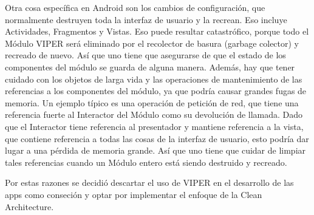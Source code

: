 Otra cosa específica en Android son los cambios de configuración, que normalmente destruyen toda la interfaz de usuario y la recrean. Eso incluye Actividades, Fragmentos y Vistas. Eso puede resultar catastrófico, porque todo el Módulo VIPER será eliminado por el recolector de basura (garbage colector) y recreado de nuevo. Así que uno tiene que asegurarse de que el estado de los componentes del módulo se guarda de alguna manera. Además, hay que tener cuidado con los objetos de larga vida y las operaciones de mantenimiento de las referencias a los componentes del módulo, ya que podría causar grandes fugas de memoria. Un ejemplo típico es una operación de petición de red, que tiene una referencia fuerte al Interactor del Módulo como su devolución de llamada. Dado que el Interactor tiene referencia al presentador y mantiene referencia a la vista, que contiene referencia a todas las cosas de la interfaz de usuario, esto podría dar lugar a una pérdida de memoria grande. Así que uno tiene que cuidar de limpiar tales referencias cuando un Módulo entero está siendo destruido y recreado.

Por estas razones se decidió descartar el uso de VIPER en el desarrollo de las apps como conseción y optar por implementar el enfoque de la Clean Architecture.


\newpage

